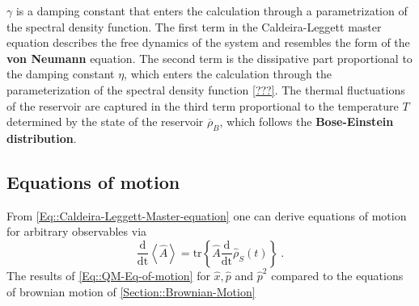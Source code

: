 	$\gamma$ is a damping constant that enters the calculation through a parametrization of the spectral density function. The first term in the Caldeira-Leggett master equation describes the free dynamics of the system and resembles the form of the \textbf{von Neumann} equation. The second term is the dissipative part proportional to the damping constant $\eta$, which enters the calculation through the parameterization of the spectral density function \autoref{???}. The thermal fluctuations of the reservoir are captured in the third term proportional to the temperature $T$ determined by the state of the reservoir $\overline{\rho}_B$, which follows the \textbf{Bose-Einstein distribution}.	
	\subsection{Equations of motion}
	From \autoref{Eq::Caldeira-Leggett-Master-equation} one can derive equations of motion for arbitrary observables via
	\begin{equation}\label{Eq::QM-Eq-of-motion}
		\frac{\text{d}}{\text{dt}} \left \langle \hat{A} \right \rangle =	\text{tr} \left\{\hat{A} \frac{\text{d}}{\text{dt} } \hat{\rho}_S(t)\right\}~.
	\end{equation}
	The results of \autoref{Eq::QM-Eq-of-motion} for $\hat{x}, \hat{p}$ and $\hat{p}^2$ compared to the equations of brownian motion of \autoref{Section::Brownian-Motion} 
